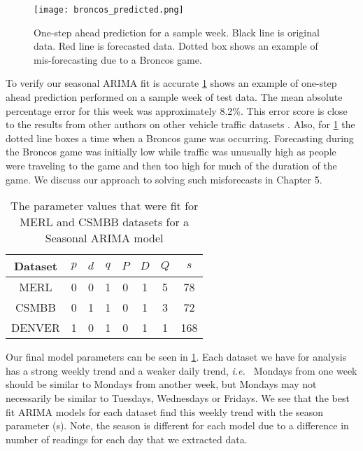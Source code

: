 \begin{figure}[!h]
\begin{center}
\texttt{[image: broncos\_predicted.png]}
\end{center}
\caption{One-step ahead prediction for a sample week.  Black line is original data.  Red line is forecasted data.  Dotted box shows an example of mis-forecasting due to a Broncos game.}
\label{fig:arima_prediction}
\end{figure}

To verify our seasonal ARIMA fit is accurate \ref{fig:arima_prediction} shows an example of one-step ahead prediction performed on a sample week of test data.  The mean absolute percentage error for this week was approximately 8.2\%.  This error score is close to the results from other authors on other vehicle traffic datasets \cite{Williams2003,Smith1997}.  Also, for \ref{fig:arima_prediction} the dotted line boxes a time when a Broncos game was occurring.  Forecasting during the Broncos game was initially low while traffic was unusually high as people were traveling to the game and then too high for much of the duration of the game.  We discuss our approach to solving such misforecasts in Chapter 5.

\begin{table}[!h]
\centering
\caption{The parameter values that were fit for MERL and CSMBB datasets for a Seasonal ARIMA model}
\begin{tabular}{|c|c|c|c|c|c|c|c|} \hline
Dataset & $p$ & $d$ & $q$ & $P$ & $D$ & $Q$ & $s$\\ \hline
MERL & 0 & 0 & 1 & 0 & 1 & 5 & 78\\ \hline
CSMBB & 0 & 1 & 1 & 0 & 1 & 3 & 72\\ \hline
DENVER & 1 & 0 & 1 & 0 & 1 & 1 & 168\\ \hline
\end{tabular}
\label{fig:sarimatab}
\end{table}

Our final model parameters can be seen in \ref{fig:sarimatab}.  Each dataset we have for analysis has a strong weekly trend and a weaker daily trend, \textit{i.e.\ } Mondays from one week should be similar to Mondays from another week, but Mondays may not necessarily be similar to Tuesdays, Wednesdays or Fridays.  We see that the best fit ARIMA models for each dataset find this weekly trend with the season parameter (s).  Note, the season is different for each model due to a difference in number of readings for each day that we extracted data.


